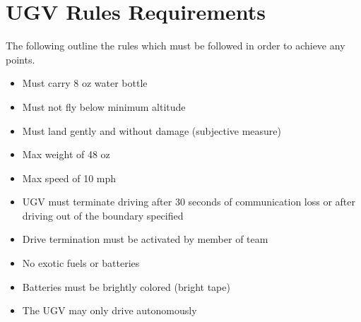 \documentclass[]{auvsi_doc}
\begin{document}
\begin{AUVSITitlePage}
\begin{artifacttable}
\end{artifacttable}
\end{AUVSITitlePage}

\section{UGV Rules Requirements}
The following outline the rules which must be followed in order to achieve any points. 
\begin{itemize}
	\item Must carry 8 oz water bottle
	\item Must not fly below minimum altitude
	\item Must land gently and without damage (subjective measure)
	\item Max weight of 48 oz
	\item Max speed of 10 mph
	\item UGV must terminate driving after 30 seconds of communication loss or after driving out of the boundary specified
	\item Drive termination must be activated by member of team
	\item No exotic fuels or batteries
	\item Batteries must be brightly colored (bright tape)
	\item The UGV may only drive autonomously
\end{itemize}

\end{document}
